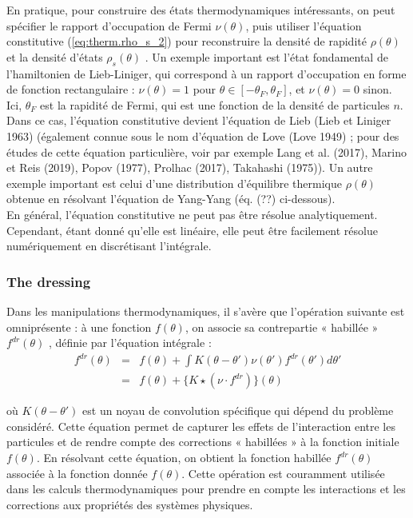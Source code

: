 En pratique, pour construire des états thermodynamiques intéressants, on peut spécifier le rapport d'occupation de Fermi $\nu(\theta)$, puis utiliser l'équation constitutive (\ref{eq:therm.rho_s_2}) pour reconstruire la densité de rapidité $\rho(\theta)$ et la densité d'états $\rho_s(\theta)$ . Un exemple important est l'état fondamental de l'hamiltonien de Lieb-Liniger, qui correspond à un rapport d'occupation en forme de fonction rectangulaire : $\nu(\theta) = 1$ pour $\theta \in  [-\theta_F, \theta_F]$, et $\nu(\theta) = 0$ sinon. Ici, $\theta_F$ est la rapidité de Fermi, qui est une fonction de la densité de particules $n$. Dans ce cas, l'équation constitutive devient l'équation de Lieb (Lieb et Liniger 1963) (également connue sous le nom d'équation de Love (Love 1949) ; pour des études de cette équation particulière, voir par exemple Lang et al. (2017), Marino et Reis (2019), Popov (1977), Prolhac (2017), Takahashi (1975)). Un autre exemple important est celui d'une distribution d'équilibre thermique $\rho(\theta)$ obtenue en résolvant l'équation de Yang-Yang (éq. (??) ci-dessous).\\

En général, l'équation constitutive ne peut pas être résolue analytiquement. Cependant, étant donné qu'elle est linéaire, elle peut être facilement résolue numériquement en discrétisant l'intégrale.

\subsubsection{The dressing}

Dans les manipulations thermodynamiques, il s'avère que l'opération suivante est omniprésente : à une fonction $f(\theta)$, on associe sa contrepartie « habillée » $f^{dr}(\theta)$
, définie par l'équation intégrale :
\begin{eqnarray}
	f^{dr}(\theta) & = & f(\theta) + \int K ( \theta - \theta' ) \nu ( \theta' ) f^{dr}(\theta') d \theta ' \\
	& = & 	f(\theta) + \{ K \star (\nu \cdot f^{dr}) \} ( \theta ) 		
\end{eqnarray}


où $K ( \theta - \theta' )$ est un noyau de convolution spécifique qui dépend du problème considéré. Cette équation permet de capturer les effets de l'interaction entre les particules et de rendre compte des corrections « habillées » à la fonction initiale $f(\theta)$. En résolvant cette équation, on obtient la fonction habillée $f^{dr}(\theta)$ associée à la fonction donnée $f(\theta)$. Cette opération est couramment utilisée dans les calculs thermodynamiques pour prendre en compte les interactions et les corrections aux propriétés des systèmes physiques.\\

